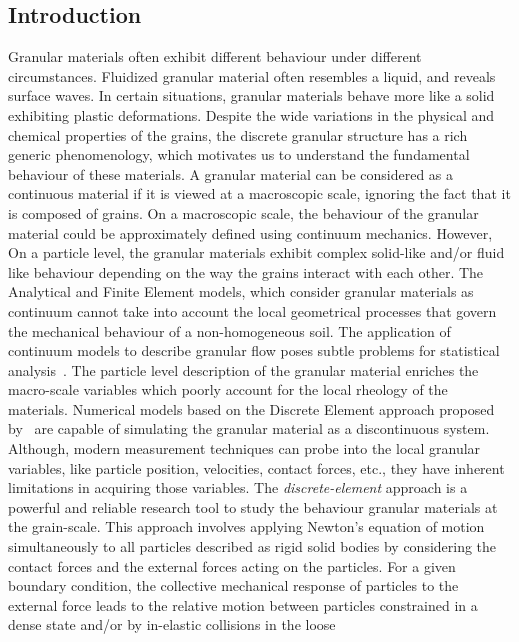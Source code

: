 \subsection{Introduction}
Granular materials often exhibit different behaviour under different 
circumstances. Fluidized 
granular material often resembles a liquid, and reveals surface waves. In 
certain situations, 
granular materials behave more like a solid exhibiting plastic deformations. 
Despite the wide 
variations in the physical and chemical properties of the grains, the discrete 
granular structure 
has a rich generic phenomenology, which motivates us to understand the 
fundamental behaviour of 
these materials. A granular material can be considered as a continuous material 
if it is viewed at 
a macroscopic scale, ignoring the fact that it is composed of grains. On a 
macroscopic scale, the 
behaviour of the granular material could be approximately defined using 
continuum mechanics. 
However, On a particle level, the granular materials exhibit complex solid-like 
and/or fluid like 
behaviour depending on the way the grains interact with each other. The 
Analytical and Finite 
Element models, which consider granular materials as continuum cannot take into 
account the local 
geometrical processes that govern the mechanical behaviour of a non-homogeneous 
soil. The 
application of continuum models to describe granular flow poses subtle problems 
for statistical 
analysis~\citep{mehta1994}. The particle level description of the granular 
material enriches the 
macro-scale variables which poorly account for the local rheology of the 
materials. Numerical 
models based on the Discrete Element approach proposed by~\citet{Cundall1979} 
are capable of  
simulating the granular material as a discontinuous system. Although, modern 
measurement 
techniques 
can probe into the local granular variables, like particle position, 
velocities, contact forces, 
etc., they have inherent limitations in acquiring those variables. The 
\textit{discrete-element} 
approach is a powerful and reliable research tool to study the behaviour 
granular materials at the 
grain-scale. This approach involves applying Newton's equation of motion 
simultaneously to all 
particles described as rigid solid bodies by considering the contact forces and 
the external 
forces 
acting on the particles. For a given boundary condition, the collective 
mechanical response of 
particles to the external force leads to the relative motion between particles 
constrained in a 
dense state and/or by in-elastic collisions in the loose 
